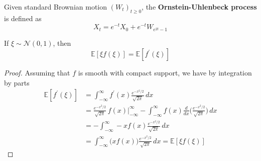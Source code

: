 \documentclass{article}
\begin{document}
\begin{definition}
Given standard Brownian motion $(W_t)_{t \geq 0}$, the \textbf{Ornstein-Uhlenbeck process} is defined as 
\[X_t = e^{-t} X_0 + e^{-t} W_{e^{2t} - 1}\]
\end{definition}

\begin{lemma}
If $\xi \sim \mathcal{N}(0, 1)$, then 
\[\mathbb{E}[ \xi f(\xi)] = \mathbb{E}[f^\prime (\xi)]\]
\end{lemma}
\begin{proof}
Assuming that $f$ is smooth with compact support, we have by integration by parts 
\begin{align*}
    \mathbb{E}[f^\prime (\xi)] & = \int_{-\infty}^\infty f^\prime(x) \frac{e^{-x^2 / 2}}{\sqrt{2\pi}} \,dx \\ 
    & = \frac{e^{-x^2 / 2}}{\sqrt{2\pi}} \, f(x) \bigg|_{-\infty}^\infty - \int_{-\infty}^\infty f(x) \frac{d}{dx} \bigg(\frac{e^{-x^2 / 2}}{\sqrt{2\pi}}\bigg) \,dx \\
    & = - \int_{-\infty}^\infty -x f(x) \frac{e^{-x^2 / 2}}{\sqrt{2\pi}} \,dx \\
    & = \int_{-\infty}^\infty \big( x f(x)\big) \frac{e^{-x^2 / 2}}{\sqrt{2\pi}}\,dx = \mathbb{E}[\xi f(\xi)]
\end{align*}
\end{proof}
\end{document}

